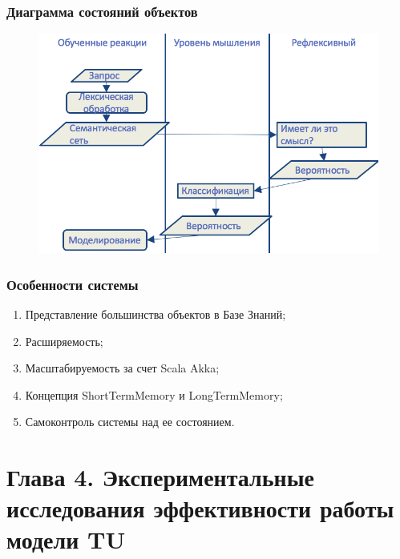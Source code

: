 \documentclass[14pt]{beamer}
\begin{document}
\begin{frame}
\frametitle{Диаграмма состояний объектов}
\begin{figure} [h] 
  \center
  \includegraphics [scale=0.35] {ObjectState}
  \label{img:ObjectState}  
\end{figure}
\end{frame}

\begin{frame}
\frametitle{Особенности системы}
\begin{enumerate}
	\item Представление большинства объектов в Базе Знаний;
	\item Расширяемость;
	\item Масштабируемость за счет Scala Akka;
	\item Концепция ShortTermMemory и LongTermMemory;
	\item Самоконтроль системы над ее состоянием.
\end{enumerate}
\end{frame}


%
%
\section[Глава 4]{Глава 4. Экспериментальные исследования эффективности работы модели TU}
\end{document}
